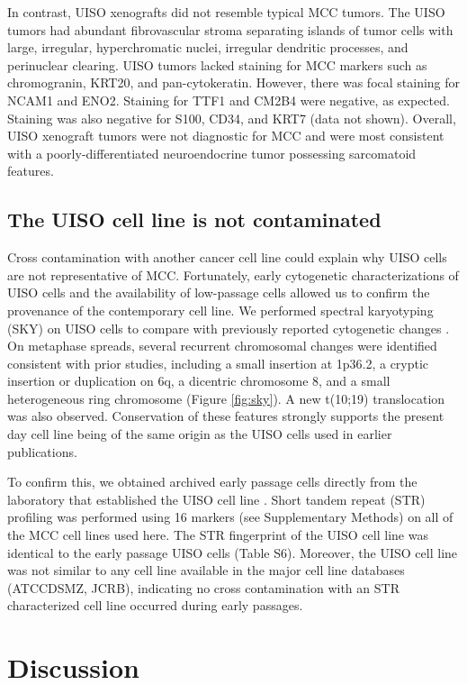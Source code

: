\documentclass[10pt]{article}
\begin{document}
In contrast, UISO xenografts did not resemble typical MCC tumors.
The UISO tumors had abundant fibrovascular stroma separating islands of tumor cells with large, irregular, hyperchromatic nuclei, irregular dendritic processes, and perinuclear clearing.
UISO tumors lacked staining for MCC markers such as chromogranin, KRT20, and pan-cytokeratin.
However, there was focal staining for NCAM1 and ENO2.
Staining for TTF1 and CM2B4 were negative, as expected.
Staining was also negative for S100, CD34, and KRT7 (data not shown).
Overall, UISO xenograft tumors were not diagnostic for MCC and were most consistent with a poorly-differentiated neuroendocrine tumor possessing sarcomatoid features.

\subsection*{The UISO cell line is not contaminated}
Cross contamination with another cancer cell line could explain why UISO cells are not representative of MCC.
Fortunately, early cytogenetic characterizations of UISO cells and the availability of low-passage cells allowed us to confirm the provenance of the contemporary cell line.
We performed spectral karyotyping (SKY) on UISO cells to compare with previously reported cytogenetic changes \citep{VanGele2002Combined,VanGele1998Characteristic}.
On metaphase spreads, several recurrent chromosomal changes were identified consistent with prior studies, including a small insertion at 1p36.2, a cryptic insertion or duplication on 6q, a dicentric chromosome 8, and a small heterogeneous ring chromosome (Figure \ref{fig:sky}).
A new t(10;19) translocation was also observed.
Conservation of these features strongly supports the present day cell line being of the same origin as the UISO cells used in earlier publications.

To confirm this, we obtained archived early passage cells directly from the laboratory that established the UISO cell line \citep{Ronan1993Merkel}.
Short tandem repeat (STR) profiling \citep{Masters2001Short} was performed using 16 markers (see Supplementary Methods) on all of the MCC cell lines used here.
The STR fingerprint of the UISO cell line was identical to the early passage UISO cells (Table S6).
Moreover, the UISO cell line was not similar to any cell line available in the major cell line databases (ATCCDSMZ, JCRB), indicating no cross contamination with an STR characterized cell line occurred during early passages.

\section*{Discussion}
\end{document}
